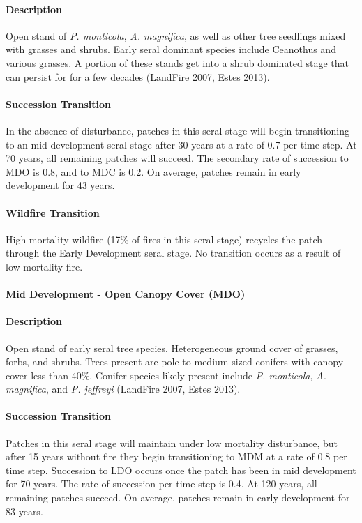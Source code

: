 \paragraph{Description} Open stand of \emph{P. monticola}, \emph{A. magnifica}, as well as other tree seedlings mixed with grasses and shrubs. Early seral dominant species include Ceanothus and various grasses. A portion of these stands get into a shrub dominated stage that can persist for for a few decades (LandFire 2007, Estes 2013).

\paragraph{Succession Transition} In the absence of disturbance, patches in this seral stage will begin transitioning to an mid development seral stage after 30 years at a rate of 0.7 per time step. At 70 years, all remaining patches will succeed. The secondary rate of succession to MDO is 0.8, and to MDC is 0.2. On average, patches remain in early development for 43 years.

\paragraph{Wildfire Transition} High mortality wildfire (17\% of fires in this seral stage) recycles the patch through the Early Development seral stage. No transition occurs as a result of low mortality fire.

\noindent\hrulefill


\paragraph{Mid Development - Open Canopy Cover (MDO)}

\paragraph{Description} Open stand of early seral tree species. Heterogeneous ground cover of grasses, forbs, and shrubs. Trees present are pole to medium sized conifers with canopy cover less than 40\%. Conifer species likely present include \emph{P. monticola}, \emph{A. magnifica}, and \emph{P. jeffreyi} (LandFire 2007, Estes 2013).

\paragraph{Succession Transition} Patches in this seral stage will maintain under low mortality disturbance, but after 15 years without fire they begin transitioning to MDM at a rate of 0.8 per time step. Succession to LDO occurs once the patch has been in mid development for 70 years. The rate of succession per time step is 0.4. At 120 years, all remaining patches succeed. On average, patches remain in early development for 83 years.


